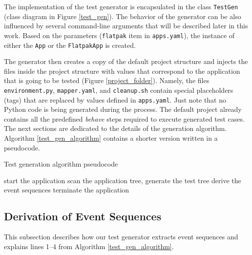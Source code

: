 The implementation of the test generator is encapsulated in the class \texttt{TestGen} (class diagram in Figure \ref{test_gen}). The behavior of the generator can be also influenced by several command-line arguments that will be described later in this work. Based on the parameters (\texttt{flatpak} item in \texttt{apps.yaml}), the instance of either the \texttt{App} or the \texttt{FlatpakApp} is created. 

The generator then creates a copy of the default project structure and injects the files inside the project structure with values that correspond to the application that is going to be tested (Figure \ref{project_folder}). Namely, the files \texttt{environment.py}, \texttt{mapper.yaml}, and \texttt{cleanup.sh} contain special placeholders (tags) that are replaced by values defined in \texttt{apps.yaml}. Just note that no Python code is being generated during the process. The default project already contains all the predefined \textit{behave} steps required to execute generated test cases.
The next sections are dedicated to the details of the generation algorithm. Algorithm \ref{test_gen_algorithm} contains a shorter version written in a pseudocode. 

\begin{algorithm}[tb!]
\caption{Test generation algorithm pseudocode}
\label{test_gen_algorithm}
\SetAlgoLined
{}
 start the application\;
 scan the application tree, generate the test tree\;
 derive the event sequences\;
 terminate the application\;
\end{algorithm}
\subsection{Derivation of Event Sequences}\label{event_sequences}
This subsection describes how our test generator extracts event sequences and explains lines 1--4 from Algorithm \ref{test_gen_algorithm}.

